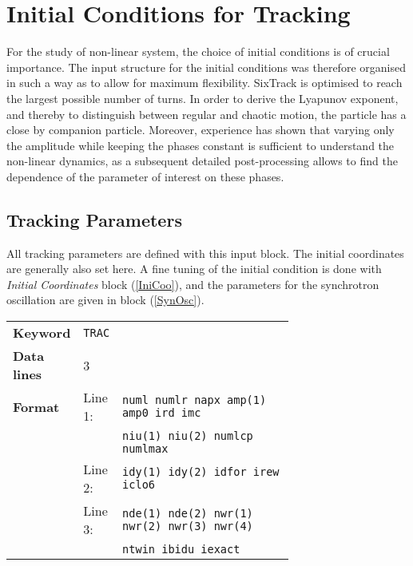 
\chapter{Initial Conditions for Tracking} \label{InitCondTrack}

For the study of non-linear system, the choice of initial conditions is of crucial importance.
The input structure for the initial conditions was therefore organised in such a way as to allow for maximum flexibility.
SixTrack is optimised to reach the largest possible number of turns.
In order to derive the Lyapunov exponent, and thereby to distinguish between regular and chaotic motion, the particle has a close by companion particle.
Moreover, experience has shown that varying only the amplitude while keeping the phases constant is sufficient to understand the non-linear dynamics, as a subsequent detailed post-processing allows to find the dependence of the parameter of interest on these phases.

\section{Tracking Parameters} \label{TraPar}

All tracking parameters are defined with this input block.
The initial coordinates are generally also set here.
A fine tuning of the initial condition is done with \textit{Initial Coordinates} block (\ref{IniCoo}), and the parameters for the synchrotron oscillation are given in block (\ref{SynOsc}).

\bigskip
\begin{tabular}{@{}llp{0.7\linewidth}}
    \textbf{Keyword}    & \texttt{TRAC}\index{TRAC} &\\
    \textbf{Data lines} & 3 &\\
    \textbf{Format}     & Line 1: & \texttt{numl numlr napx amp(1) amp0 ird imc} \\
                        &         & \texttt{niu(1) niu(2) numlcp numlmax} \\
                        & Line 2: & \texttt{idy(1) idy(2) idfor irew iclo6} \\
                        & Line 3: & \texttt{nde(1) nde(2) nwr(1) nwr(2) nwr(3) nwr(4)} \\
                        &         & \texttt{ntwin ibidu iexact}
\end{tabular}

